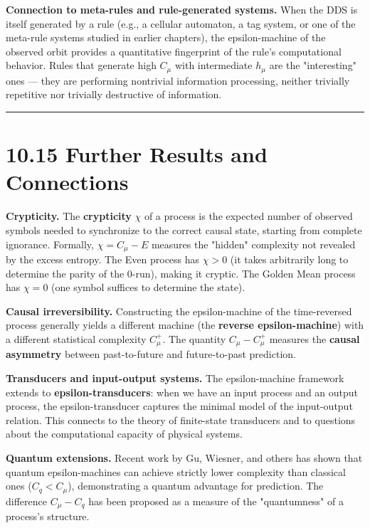 \textbf{Connection to meta-rules and rule-generated systems.} When the DDS is itself generated by a rule (e.g., a cellular automaton, a tag system, or one of the meta-rule systems studied in earlier chapters), the epsilon-machine of the observed orbit provides a quantitative fingerprint of the rule's computational behavior. Rules that generate high $C_\mu$ with intermediate $h_\mu$ are the "interesting" ones --- they are performing nontrivial information processing, neither trivially repetitive nor trivially destructive of information.

\bigskip\hrule\bigskip

\section{10.15 Further Results and Connections}

\textbf{Crypticity.} The \textbf{crypticity} $\chi$ of a process is the expected number of observed symbols needed to synchronize to the correct causal state, starting from complete ignorance. Formally, $\chi = C_\mu - E$ measures the "hidden" complexity not revealed by the excess entropy. The Even process has $\chi > 0$ (it takes arbitrarily long to determine the parity of the $0$-run), making it cryptic. The Golden Mean process has $\chi = 0$ (one symbol suffices to determine the state).

\textbf{Causal irreversibility.} Constructing the epsilon-machine of the time-reversed process generally yields a different machine (the \textbf{reverse epsilon-machine}) with a different statistical complexity $C_\mu^+$. The quantity $C_\mu - C_\mu^+$ measures the \textbf{causal asymmetry} between past-to-future and future-to-past prediction.

\textbf{Transducers and input-output systems.} The epsilon-machine framework extends to \textbf{epsilon-transducers}: when we have an input process and an output process, the epsilon-transducer captures the minimal model of the input-output relation. This connects to the theory of finite-state transducers and to questions about the computational capacity of physical systems.

\textbf{Quantum extensions.} Recent work by Gu, Wiesner, and others has shown that quantum epsilon-machines can achieve strictly lower complexity than classical ones ($C_q < C_\mu$), demonstrating a quantum advantage for prediction. The difference $C_\mu - C_q$ has been proposed as a measure of the "quantumness" of a process's structure.

